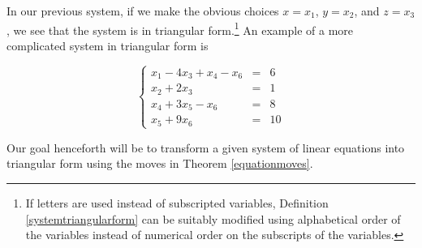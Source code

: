 \documentclass{ximera}
\begin{document}

 

In our previous system, if we make the obvious choices $x = x_1$, $y = x_2$, and $z = x_3$, we see that the system is in triangular form.\footnote{If letters are used instead of subscripted variables, Definition \ref{systemtriangularform} can be suitably modified using alphabetical order of the variables instead of numerical order on the subscripts of the variables.}   An example of a more complicated system in triangular form is

\[ \left\{ \begin{array}{rcr} x_1 - 4x_3 + x_4 - x_6 & = & 6 \\ x_2 + 2x_3 & = & 1 \\ x_4 + 3x_5 - x_6 & = & 8 \\ x_5 + 9x_6 & = & 10 \end{array} \right.\]

Our goal henceforth will be to transform a given system of linear equations into triangular form using the moves in Theorem \ref{equationmoves}.
\end{document}
